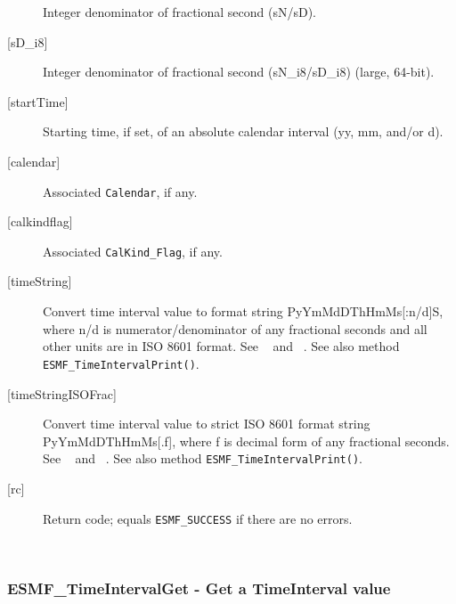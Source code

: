 \begin{description}
            Integer denominator of fractional second (sN/sD).
       \item[{[sD\_i8]}]
            Integer denominator of fractional second (sN\_i8/sD\_i8)
                                                             (large, 64-bit).
       \item[{[startTime]}]
            Starting time, if set, of an absolute calendar interval
            (yy, mm, and/or d).
       \item[{[calendar]}]
            Associated {\tt Calendar}, if any.
       \item[{[calkindflag]}]
            Associated {\tt CalKind\_Flag}, if any.
       \item[{[timeString]}]
            \begin{sloppypar}
            Convert time interval value to format string PyYmMdDThHmMs[:n/d]S,
            where n/d is numerator/denominator of any fractional seconds and
            all other units are in ISO 8601 format.  See ~\cite{ISO} and
            ~\cite{ISOnotes}.  See also method {\tt ESMF\_TimeIntervalPrint()}.
            \end{sloppypar}
       \item[{[timeStringISOFrac]}]
            Convert time interval value to strict ISO 8601 format string
            PyYmMdDThHmMs[.f], where f is decimal form of any fractional
            seconds.  See ~\cite{ISO} and ~\cite{ISOnotes}.  See also method
            {\tt ESMF\_TimeIntervalPrint()}.
       \item[{[rc]}]
            Return code; equals {\tt ESMF\_SUCCESS} if there are no errors.
       \end{description}
   
 
\mbox{}\hrulefill\ 
 
\subsubsection [ESMF\_TimeIntervalGet] {ESMF\_TimeIntervalGet - Get a TimeInterval value }



